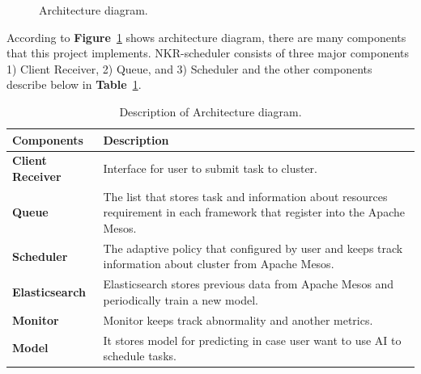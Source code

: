 \documentclass[12pt,oneside,openright,a4paper]{cpe-english-project}
\begin{document}
\begin{figure}[!h]\centering
  \setlength{\fboxrule}{0mm} %
  \setlength{\fboxsep}{0cm}
  \caption{Architecture diagram.}\label{fig:ArchitectureDiagram}
\end{figure}

\hspace{10mm}According to \textbf{Figure}~\ref{fig:ArchitectureDiagram} shows architecture diagram, there are many components that this project implements. NKR-scheduler consists of three major  components 1) Client Receiver, 2) Queue, and 3) Scheduler and the other components describe below in \textbf{Table}~\ref{tbl:ArchitectureDiagramTable}.

\begin{table}[!h]
  \caption{Description of Architecture diagram.}\label{tbl:ArchitectureDiagramTable}
  \begin{tabular}{@{}|p{}|p{}|}
    \hline
    \textbf{Components} & \textbf{Description}\\
    \hline
    \textbf{Client Receiver} & Interface for user to submit task to cluster.\\
    \hline
    \textbf{Queue} & The list that stores task and information about resources requirement in each framework that register into the Apache Mesos.\\
    \hline
    \textbf{Scheduler} & The adaptive policy that configured by user and keeps track information about cluster from Apache Mesos.\\
    \hline
    \textbf{Elasticsearch} & Elasticsearch stores previous data from Apache Mesos and periodically train a new model.\\
    \hline
    \textbf{Monitor} & Monitor keeps track abnormality and another metrics.\\
    \hline
    \textbf{Model} & It stores model for predicting in case user want to use AI to schedule tasks.\\
    \hline
  \end{tabular}
\end{table}
\end{document}

